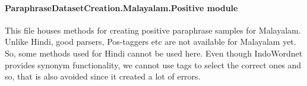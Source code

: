 \documentclass[letterpaper,10pt,english]{sphinxmanual}
\begin{document}
\paragraph{ParaphraseDatasetCreation.Malayalam.Positive module}
\label{\detokenize{ParaphraseDatasetCreation.Malayalam:module-ParaphraseDatasetCreation.Malayalam.Positive}}\label{\detokenize{ParaphraseDatasetCreation.Malayalam:paraphrasedatasetcreation-malayalam-positive-module}}
This file houses methods for creating positive paraphrase samples for 
Malayalam. Unlike Hindi, good parsers, Pos-taggers etc are not available
for Malayalam yet. So, some methods used for Hindi cannot be used here. 
Even though IndoWordnet provides synonym functionality, we cannot use 
tags to select the correct ones and so, that is also avoided since it 
created a lot of errors.
\end{document}
